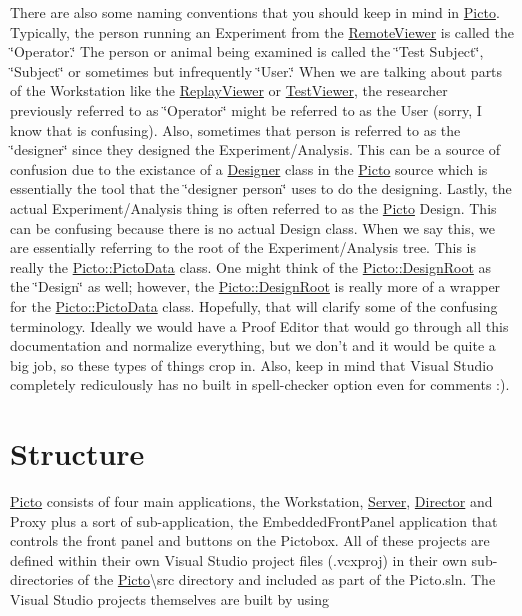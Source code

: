 There are also some naming conventions that you should keep in mind in \hyperlink{namespace_picto}{Picto}. Typically, the person running an Experiment from the \hyperlink{class_remote_viewer}{Remote\-Viewer} is called the \char`\"{}\-Operator.\char`\"{} The person or animal being examined is called the \char`\"{}\-Test Subject\char`\"{}, \char`\"{}\-Subject\char`\"{} or sometimes but infrequently \char`\"{}\-User.\char`\"{} When we are talking about parts of the Workstation like the \hyperlink{class_replay_viewer}{Replay\-Viewer} or \hyperlink{class_test_viewer}{Test\-Viewer}, the researcher previously referred to as \char`\"{}\-Operator\char`\"{} might be referred to as the User (sorry, I know that is confusing). Also, sometimes that person is referred to as the \char`\"{}designer\char`\"{} since they designed the Experiment/\-Analysis. This can be a source of confusion due to the existance of a \hyperlink{class_designer}{Designer} class in the \hyperlink{namespace_picto}{Picto} source which is essentially the tool that the \char`\"{}designer person\char`\"{} uses to do the designing. Lastly, the actual Experiment/\-Analysis thing is often referred to as the \hyperlink{namespace_picto}{Picto} Design. This can be confusing because there is no actual Design class. When we say this, we are essentially referring to the root of the Experiment/\-Analysis tree. This is really the \hyperlink{class_picto_1_1_picto_data}{Picto\-::\-Picto\-Data} class. One might think of the \hyperlink{class_picto_1_1_design_root}{Picto\-::\-Design\-Root} as the \char`\"{}\-Design\char`\"{} as well; however, the \hyperlink{class_picto_1_1_design_root}{Picto\-::\-Design\-Root} is really more of a wrapper for the \hyperlink{class_picto_1_1_picto_data}{Picto\-::\-Picto\-Data} class. Hopefully, that will clarify some of the confusing terminology. Ideally we would have a Proof Editor that would go through all this documentation and normalize everything, but we don't and it would be quite a big job, so these types of things crop in. Also, keep in mind that Visual Studio completely rediculously has no built in spell-\/checker option even for comments \-:).\hypertarget{first_code_look_first_look_structure}{}\section{Structure}\label{first_code_look_first_look_structure}
\hyperlink{namespace_picto}{Picto} consists of four main applications, the Workstation, \hyperlink{class_server}{Server}, \hyperlink{class_director}{Director} and Proxy plus a sort of sub-\/application, the Embedded\-Front\-Panel application that controls the front panel and buttons on the Pictobox. All of these projects are defined within their own Visual Studio project files (.vcxproj) in their own sub-\/directories of the \hyperlink{namespace_picto}{Picto}\textbackslash{}src directory and included as part of the Picto.\-sln. The Visual Studio projects themselves are built by using 
